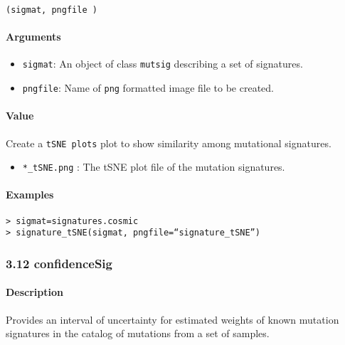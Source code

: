 \documentclass[]{article}
\providecommand{\tightlist}{%
  \setlength{\itemsep}{0pt}\setlength{\parskip}{0pt}}
\let\oldparagraph\paragraph
\renewcommand{\paragraph}[1]{\oldparagraph{#1}\mbox{}}
\begin{document}
\texttt{(sigmat,\ pngfile\ )}

\paragraph{\texorpdfstring{\textbf{Arguments
}}{Arguments }}\label{arguments-8}

\begin{itemize}
\tightlist
\item
  \texttt{sigmat}: An object of class \texttt{mutsig} describing a set
  of signatures.
\item
  \texttt{pngfile}: Name of \texttt{png} formatted image file to be
  created.
\end{itemize}

\paragraph{\texorpdfstring{\textbf{Value}}{Value}}\label{value-7}

Create a \texttt{tSNE\ plots} plot to show similarity among mutational signatures.

\begin{itemize}
\tightlist
\item
  \texttt{*\_tSNE.png} : The tSNE plot file of the mutation signatures. 

\end{itemize}

\paragraph{\texorpdfstring{\textbf{Examples}}{Examples}}\label{examples-9}

\begin{verbatim}
> sigmat=signatures.cosmic
> signature_tSNE(sigmat, pngfile=“signature_tSNE”)
\end{verbatim}

\subsubsection{3.12 confidenceSig}\label{confidencesig}

\paragraph{\texorpdfstring{\textbf{Description}}{Description}}\label{description-9}

Provides an interval of uncertainty for estimated weights of known mutation signatures in the catalog of mutations from a set of samples.
\end{document}
